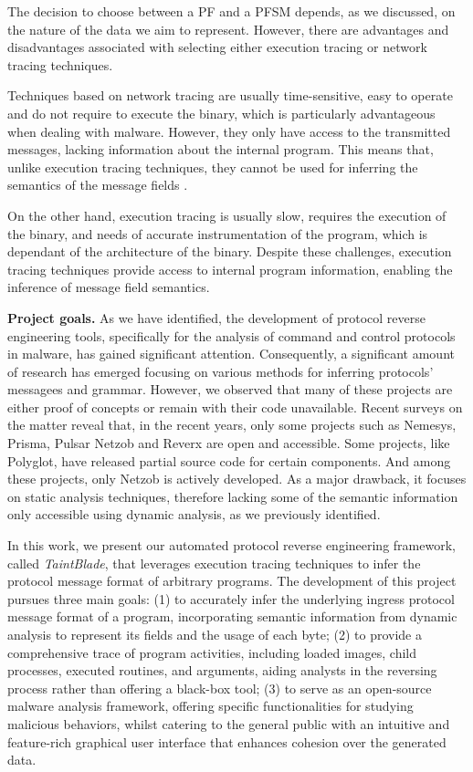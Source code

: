\documentclass[conference]{IEEEtran}
\begin{document}
The decision to choose between a PF and a PFSM depends, as we discussed, on the
nature of the data we aim to represent. However, there are advantages and
disadvantages associated with selecting either execution tracing or network
tracing techniques.

Techniques based on network tracing are usually time-sensitive, easy to operate
and do not require to execute the binary, which is particularly advantageous
when dealing with malware. However, they only have access to the transmitted
messages, lacking information about the internal program. This means that,
unlike execution tracing techniques, they cannot be used for inferring the
semantics of the message fields \cite{apre_survey}.

On the other hand, execution tracing is usually slow, requires the execution of
the binary, and needs of accurate instrumentation of the program, which is
dependant of the architecture of the binary. Despite these challenges,
execution tracing techniques provide access to internal program information,
enabling the inference of message field semantics.

\textbf{Project goals.}
As we have identified, the development of
protocol reverse engineering tools, specifically for the analysis of command and control protocols in malware, has gained significant attention.
Consequently, a significant amount of research has emerged focusing on various methods for inferring protocols' messagees and grammar.
However, we observed that many of these projects are either proof of concepts
or remain with their code unavailable. Recent
surveys on the matter\cite{apre_survey}\cite{apre_survey2} reveal that, in the recent years, only some projects such as Nemesys\cite{github_pre_nemesys}, Prisma\cite{github_pre_prisam}, Pulsar\cite{github_pre_pulsar}
Netzob\cite{github_pre_netzob} and Reverx\cite{github_pre_reverx} are open and accessible.
Some projects, like Polyglot\cite{polyglot_caballero}, have released partial source code for certain components.
And among these projects, only Netzob is actively developed. As a major drawback, it focuses on static analysis techniques, therefore lacking some of the semantic information
only accessible using dynamic analysis, as we previously identified.

In this work, we present our automated protocol reverse engineering framework,
called \textit{TaintBlade}, that leverages execution tracing techniques to
infer the protocol message format of arbitrary programs. The development of
this project pursues three main goals: (1) to accurately infer the underlying
ingress protocol message format of a program, incorporating semantic
information from dynamic analysis to represent its fields and the usage of each
byte; (2) to provide a comprehensive trace of program activities, including
loaded images, child processes, executed routines, and arguments, aiding
analysts in the reversing process rather than offering a black-box tool; (3) to
serve as an open-source malware analysis framework, offering specific
functionalities for studying malicious behaviors, whilst catering to the
general public with an intuitive and feature-rich graphical user interface that
enhances cohesion over the generated data.
\end{document}
